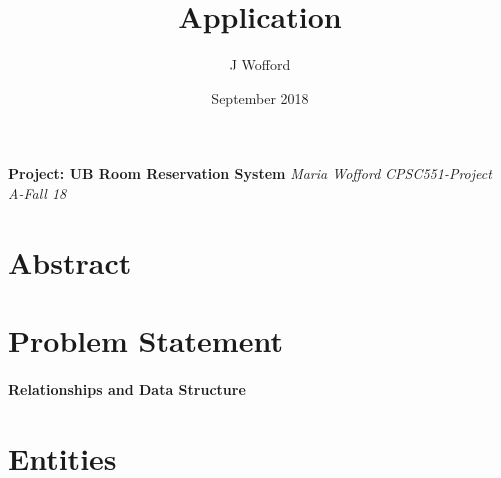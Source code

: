 \documentclass[11pt]{report}
\title{Application}
\author{J Wofford}
\date{September 2018}
\begin{document}

\begin{titlepage}
   \begin{center}
      \Large\textbf{Project: UB Room Reservation System}
      \large\textit{Maria Wofford}
      \large\textit{CPSC551-Project A-Fall 18}
   \end{center}
\end{titlepage}

\section*{Abstract}

\section*{Problem Statement}

\paragraph{Relationships and Data Structure}

\section*{Entities}
\end{document}
